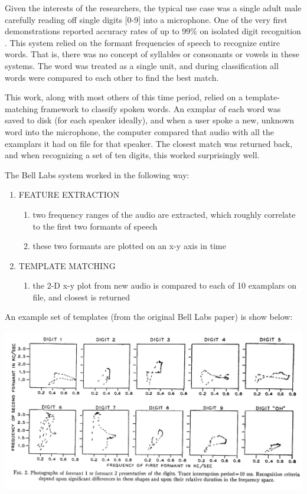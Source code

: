 \documentclass[10pt,a4paper]{article}
\begin{document}
Given the interests of the researchers, the typical use case was a single adult male carefully reading off single digits [0-9] into a microphone. One of the very first demonstrations reported accuracy rates of up to 99\% on isolated digit recognition \cite{davis1952automatic}. This system relied on the formant frequencies of speech to recognize entire words. That is, there was no concept of syllables or consonants or vowels in these systems. The word was treated as a single unit, and during classification all words were compared to each other to find the best match.

This work, along with most others of this time period, relied on a template-matching framework to classify spoken words. An exmplar of each word was saved to disk (for each speaker ideally), and when a user spoke a new, unknown word into the microphone, the computer compared that audio with all the examplars it had on file for that speaker. The closest match was returned back, and when recognizing a set of ten digits, this worked surprisingly well. 

The Bell Labs system worked in the following way:

\begin{enumerate}
\item FEATURE EXTRACTION
  \begin{enumerate}
  \item two frequency ranges of the audio are extracted, which roughly correlate to the first two formants of speech
  \item these two formants are plotted on an x-y axis in time
  \end{enumerate}
  
\item TEMPLATE MATCHING
  \begin{enumerate}
  \item the 2-D x-y plot from new audio is compared to each of 10 examplars on file, and closest is returned
  \end{enumerate}
\end{enumerate}


An example set of templates (from the original Bell Labs paper) is show below:


\begin{center}
\includegraphics[width=.9\textwidth,keepaspectratio]{figs/digits.png}
\end{center}
\end{document}
